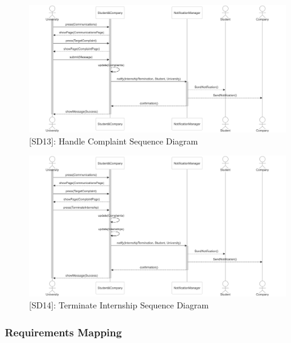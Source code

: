 \begin{figure}
    \centering
    \includegraphics[width=1\textwidth]{Latex/Images/HandleComplaintSequenceDiagram.png}
    \caption{[SD13]: Handle Complaint Sequence Diagram}
    \label{fig:SD13}
\end{figure}

\begin{figure}
    \centering
    \includegraphics[width=1\textwidth]{Latex/Images/TerminateInternshipSequenceDiagram.png}
    \caption{[SD14]: Terminate Internship Sequence Diagram}
    \label{fig:SD14}
\end{figure}
\clearpage

\subsubsection{Requirements Mapping}

